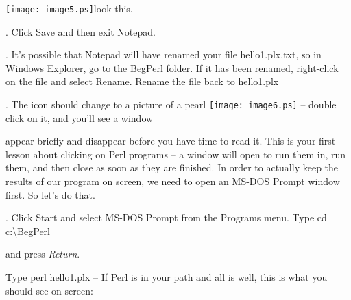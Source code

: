 \documentclass[a4paper,11pt]{book}
\begin{document}
\noindent \texttt{[image: image5.ps]}look this.

\noindent 

\noindent 

\noindent 

\noindent 

\noindent 

\noindent 

\noindent 

\noindent 

\noindent 

\noindent 

\noindent 

\noindent 

\noindent 

\noindent 

\noindent 

.   Click Save and then exit Notepad.

\noindent 

.   It's possible that Notepad will have renamed your file hello1.plx.txt, so in Windows Explorer, go to the BegPerl folder. If it has been renamed, right-click on the file and select Rename. Rename the file back to hello1.plx

\noindent 

\noindent 

.   The icon should change to a picture of a pearl \texttt{[image: image6.ps]} -- double click on it, and you'll see a window

\noindent appear briefly and disappear before you have time to read it. This is your first lesson about clicking on Perl programs -- a window will open to run them in, run them, and then close as soon as they are finished. In order to actually keep the results of our program on screen, we need to open an MS-DOS Prompt window first. So let's do that.

\noindent 

.   Click Start and select MS-DOS Prompt from the Programs menu. Type cd c:\textbackslash BegPerl

\noindent and press \textit{Return}.

\noindent 

\noindent Type perl hello1.plx -- If Perl is in your path and all is well, this is what you should see on screen:
\end{document}
